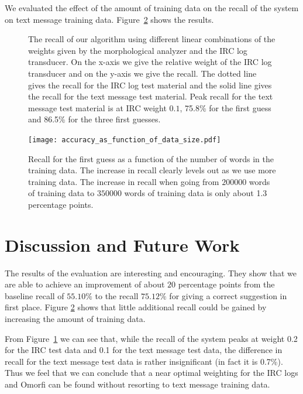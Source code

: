 \documentclass[a4paper,conference]{IEEEtran}
\begin{document}
We evaluated the effect of the amount of training data on the recall
of the system on text message training
data. Figure~\ref{fig:SaturationGraph} shows the results. 

\begin{figure}[!t]
\centerline{
\hfil
{}}
\caption{The recall of our algorithm using different linear combinations of the weights given by the morphological analyzer and the IRC log transducer. On the x-axis we give the relative weight of the IRC log transducer and on the y-axis we give the recall. The dotted line gives the recall for the IRC log test material and the solid line gives the recall for the text message test material. Peak recall for the text message test material is at IRC weight $0.1$, 75.8\% for the first guess and 86.5\% for the three first guesses.}
\label{fig:AccuraciesIRCMaterial}
\end{figure}

\begin{figure}[!t]
\begin{center}
\texttt{[image: accuracy\_as\_function\_of\_data\_size.pdf]}
\end{center}
\caption{Recall for the first guess as a function of the number of words in the training data. The increase in recall clearly levels out as we use more training data. The increase in recall when going from $200000$ words of training data to $350000$ words of training data is only about 1.3 percentage points.}
\label{fig:SaturationGraph}
\end{figure}

\section{Discussion and Future Work}
\label{sec:discussion}

The results of the evaluation are interesting and encouraging. They
show that we are able to achieve an improvement of about $20$
percentage points from the baseline recall of $55.10\%$ to the recall
$75.12\%$ for giving a correct suggestion in first place. Figure
\ref{fig:SaturationGraph} shows that little additional recall could be
gained by increasing the amount of training data.

From Figure~\ref{fig:AccuraciesIRCMaterial} we can see that, while the
recall of the system peaks at weight 0.2 for the IRC test data and
0.1 for the text message test data, the difference in recall for the
text message test data is rather insignificant (in fact it is
0.7\%). Thus we feel that we can conclude that a near optimal
weighting for the IRC logs and Omorfi can be found without resorting
to text message training data.
\end{document}
